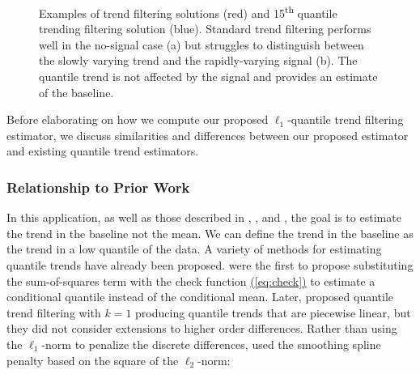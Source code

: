 \documentclass[aoas]{imsart}
\newcommand{\Eqn}[1]{\hyperref[eq:#1]{{\rm (\ref*{eq:#1})}}} %
\newcommand{\Eqn}[1]{{(\ref{eq:#1})}} %
\begin{document}
\begin{figure}
	\centering
	\caption{Examples of trend filtering solutions (red) and 15\textsuperscript{th} quantile trending filtering solution (blue). Standard trend filtering performs well in the no-signal case (a) but struggles to distinguish between the slowly varying trend and the rapidly-varying signal (b). The quantile trend is not affected by the signal and provides an estimate of the baseline.}
\end{figure}


Before elaborating on how we compute our proposed $\ell_1$-quantile trend filtering estimator, we discuss similarities and differences between our proposed estimator and existing quantile trend estimators.

\subsubsection{Relationship to Prior Work}

In this application, as well as those described in \cite{Ning2014}, \cite{marandi2015qualitative}, and \cite{pettersson2013algorithm}, the goal is to estimate the trend in the baseline not the mean. We can define the trend in the baseline as the trend in a low quantile of the data. A variety of methods for estimating quantile trends have already been proposed. \cite{Koenker1978} were the first to propose substituting the sum-of-squares term with the check function  \Eqn{check} to estimate a conditional quantile instead of the conditional mean. Later, \cite{KoenkerNgPortnoy1994} proposed quantile trend filtering with $k = 1$ producing quantile trends that are piecewise linear, but they did not consider extensions to higher order differences. Rather than using the $\ell_1$-norm to penalize the discrete differences, \cite{nychka1995nonparametric} used the smoothing spline penalty based on the square of the $\ell_2$-norm:
\end{document}
